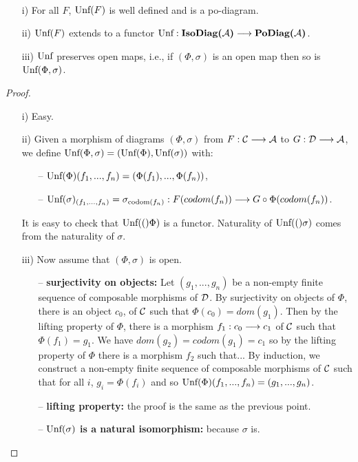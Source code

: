 \begin{lemme}~
\label{unfold}
\begin{itemize}
	\item[i)] For all $F$, $\text{Unf}(F)$ is well defined and is a po-diagram.
	\item[ii)] $\text{Unf}(F)$ extends to a functor $\text{Unf} : \textbf{IsoDiag(}\mathcal{A}\textbf{)} \longrightarrow \textbf{PoDiag(}\mathcal{A}\textbf{)}$.
	\item[iii)] $\text{Unf}$ preserves open maps, i.e., if $(\Phi,\sigma)$ is an open map then so is $\text{Unf}(\Phi,\sigma)$.
\end{itemize}
\end{lemme}

\begin{proof}~
\begin{itemize}
	\item[i)] Easy.
	\item[ii)] Given a morphism of diagrams $(\Phi,\sigma)$ from $F : \mathcal{C} \longrightarrow \mathcal{A}$ to $G : \mathcal{D} \longrightarrow \mathcal{A}$, we define $\text{Unf}(\Phi,\sigma) = (\text{Unf}(\Phi),\text{Unf}(\sigma))$ with:
		\begin{itemize}
			\item[--] $\text{Unf}(\Phi)(f_1,...,f_n) = (\Phi(f_1),...,\Phi(f_n))$,
			\item[--] $\text{Unf}(\sigma)_{(f_1,...,f_n)} = \sigma_{\text{codom}(f_n)} : F(codom(f_n)) \longrightarrow G\circ\Phi(codom(f_n))$.
		\end{itemize}
		It is easy to check that $\text{Unf}(()\Phi)$ is a functor. Naturality of $\text{Unf}(()\sigma)$ comes from the naturality of $\sigma$.
	\item[iii)] Now assume that $(\Phi,\sigma)$ is open. 
		\begin{itemize}
			\item[--] \textbf{surjectivity on objects:} Let $(g_1,...,g_n)$ be a non-empty finite sequence of composable morphisms of $\mathcal{D}$. By surjectivity on objects of $\Phi$, there is an object $c_0$, of $\mathcal{C}$ such that $\Phi(c_0) = dom(g_1)$. Then by the lifting property of $\Phi$, there is a morphism $f_1 : c_0 \longrightarrow c_1$ of $\mathcal{C}$ such that $\Phi(f_1) = g_1$. We have $dom(g_2) = codom(g_1) = c_1$ so by the lifting property of $\Phi$ there is a morphism $f_2$ such that... By induction, we construct a non-empty finite sequence of composable morphisms of $\mathcal{C}$ such that for all $i$, $g_i = \Phi(f_i)$ and so $\text{Unf}(\Phi)(f_1,...,f_n) = (g_1,...,g_n)$.
			\item[--] \textbf{lifting property:} the proof is the same as the previous point.
			\item[--] \textbf{$\text{Unf}(\sigma)$ is a natural isomorphism:} because $\sigma$ is.
		\end{itemize}
\end{itemize}
\end{proof}

